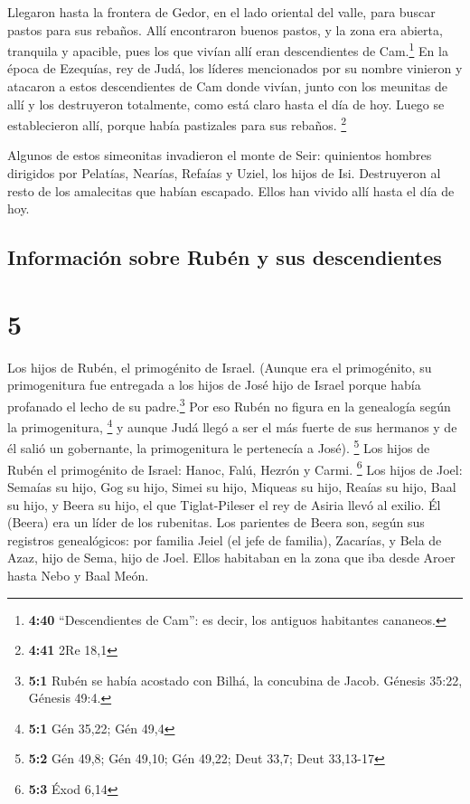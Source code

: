  Llegaron hasta la frontera de Gedor, en el lado oriental
del valle, para buscar pastos para sus rebaños.  Allí
encontraron buenos pastos, y la zona era abierta, tranquila y apacible,
pues los que vivían allí eran descendientes de Cam.\footnote{\textbf{4:40}
  ``Descendientes de Cam'': es decir, los antiguos habitantes cananeos.}
 En la época de Ezequías, rey de Judá, los líderes
mencionados por su nombre vinieron y atacaron a estos descendientes de
Cam donde vivían, junto con los meunitas de allí y los destruyeron
totalmente, como está claro hasta el día de hoy. Luego se establecieron
allí, porque había pastizales para sus rebaños. \footnote{\textbf{4:41}
  2Re 18,1}

 Algunos de estos simeonitas invadieron el monte de Seir:
quinientos hombres dirigidos por Pelatías, Nearías, Refaías y Uziel, los
hijos de Isi.  Destruyeron al resto de los amalecitas que
habían escapado. Ellos han vivido allí hasta el día de hoy.

\hypertarget{informaciuxf3n-sobre-rubuxe9n-y-sus-descendientes}{%
\subsection{Información sobre Rubén y sus
descendientes}\label{informaciuxf3n-sobre-rubuxe9n-y-sus-descendientes}}

\hypertarget{section-4}{%
\section{5}\label{section-4}}

 Los hijos de Rubén, el primogénito de Israel. (Aunque era
el primogénito, su primogenitura fue entregada a los hijos de José hijo
de Israel porque había profanado el lecho de su padre.\footnote{\textbf{5:1}
  Rubén se había acostado con Bilhá, la concubina de Jacob. Génesis
  35:22, Génesis 49:4.} Por eso Rubén no figura en la genealogía según
la primogenitura, \footnote{\textbf{5:1} Gén 35,22; Gén 49,4}
 y aunque Judá llegó a ser el más fuerte de sus hermanos y
de él salió un gobernante, la primogenitura le pertenecía a José).
\footnote{\textbf{5:2} Gén 49,8; Gén 49,10; Gén 49,22; Deut 33,7; Deut
  33,13-17}  Los hijos de Rubén el primogénito de Israel:
Hanoc, Falú, Hezrón y Carmi. \footnote{\textbf{5:3} Éxod 6,14}
 Los hijos de Joel: Semaías su hijo, Gog su hijo, Simei su
hijo,  Miqueas su hijo, Reaías su hijo, Baal su hijo,
 y Beera su hijo, el que Tiglat-Pileser el rey de Asiria
llevó al exilio. Él (Beera) era un líder de los rubenitas.
 Los parientes de Beera son, según sus registros
genealógicos: por familia Jeiel (el jefe de familia), Zacarías,
 y Bela de Azaz, hijo de Sema, hijo de Joel. Ellos
habitaban en la zona que iba desde Aroer hasta Nebo y Baal Meón.

